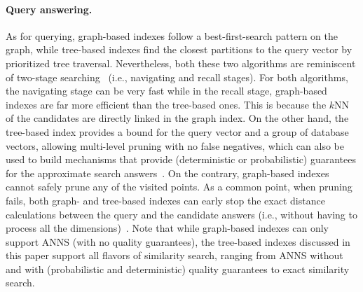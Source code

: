 \documentclass[11pt]{article}
\begin{document}
\paragraph{Query answering.}
As for querying, graph-based indexes follow a best-first-search pattern on the graph, while tree-based indexes find the closest partitions to the query vector by prioritized tree traversal.
Nevertheless, both these two algorithms are reminiscent of two-stage searching~\cite{osdi} (i.e., navigating and recall stages).
For both algorithms, the navigating stage can be very fast while in the recall stage, graph-based indexes are far more efficient than the tree-based ones.
This is because the $k$NN of the candidates are directly linked in the graph index.
On the other hand, the tree-based index provides a bound for the query vector and a group of database vectors, allowing multi-level pruning with no false negatives, which can also be used to build mechanisms that provide (deterministic or probabilistic) guarantees for the approximate search answers~\cite{hydra2,pros}.
On the contrary, graph-based indexes cannot safely prune any of the visited points. 
As a common point, when pruning fails, both graph- and tree-based indexes can early stop the exact distance calculations between the query and the candidate answers (i.e., without having to process all the dimensions)~\cite{adsampling,kdd11}.
Note that while graph-based indexes can only support ANNS (with no quality guarantees), the tree-based indexes discussed in this paper support all flavors of similarity search, ranging from ANNS without and with (probabilistic and deterministic) quality guarantees to exact similarity search. 
\end{document}
